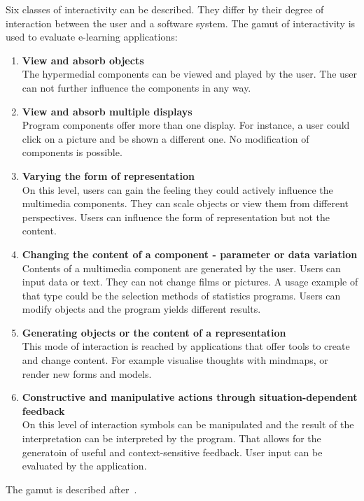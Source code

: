 Six classes of interactivity can be described. They differ by their degree of
interaction between the user and a software system.
The gamut of interactivity is used to evaluate e-learning applications:
\begin{enumerate}
\item \textbf{View and absorb objects} \\
      The hypermedial components can be viewed and played by the user.
      The user can not further influence the components in any way.
\item \textbf{View and absorb multiple displays} \\
      Program components offer more than one display. For instance, a user
      could click on a picture and be shown a different one.
      No modification of components is possible.
\item \textbf{Varying the form of representation} \\
      On this level, users can gain the feeling they could actively influence
      the multimedia components. They can scale objects or view them from
      different perspectives. Users can influence the form of representation
      but not the content.
\item \textbf{Changing the content of a component - parameter or data 
      variation} \\
      Contents of a multimedia component are generated by the user. Users can
      input data or text. They can not change films or pictures.
      A usage example of that type could be the selection methods of statistics
      programs. Users can modify objects and the program yields different 
      results.
\item \textbf{Generating objects or the content of a representation} \\
      This mode of interaction is reached by applications that offer tools to
      create and change content. For example visualise thoughts with mindmaps,
      or render new forms and models.
\item \textbf{Constructive and manipulative actions through 
      situation-dependent feedback} \\
      On this level of interaction symbols can be manipulated and the result of
      the interpretation can be interpreted by the program.
      That allows for the generatoin of useful and context-sensitive feedback.
      User input can be evaluated by the application.
\end{enumerate}
The gamut is described after~.

